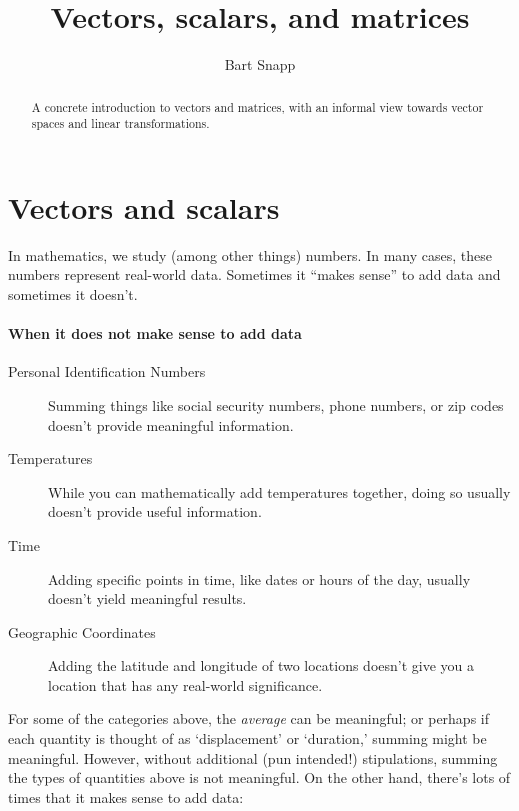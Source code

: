\documentclass{ximera}
\author{Bart Snapp}
\title{Vectors, scalars, and matrices}
\begin{document}
\begin{abstract}
  A concrete introduction to vectors and matrices, with an informal
  view towards vector spaces and linear transformations.
\end{abstract}
\maketitle


\section{Vectors and scalars}

In mathematics, we study (among other things) numbers. In many cases,
these numbers represent real-world data. Sometimes it ``makes sense''
to add data and sometimes it doesn't.
\paragraph{When it does not make sense to add data}
\begin{description}
\item[Personal Identification Numbers] Summing things like social
  security numbers, phone numbers, or zip codes doesn't provide
  meaningful information.
\item[Temperatures] While you can mathematically add temperatures
  together, doing so usually doesn't provide useful information.
\item[Time] Adding specific points in time, like dates or hours of the
  day, usually doesn't yield meaningful results. 
\item[Geographic Coordinates] Adding the latitude and longitude of two
  locations doesn't give you a location that has any real-world
  significance.
\end{description}
For some of the categories above, the \textit{average} can be
meaningful; or perhaps if each quantity is thought of as
`displacement' or `duration,' summing might be meaningful. However,
without additional (pun intended!) stipulations, summing the types of
quantities above is not meaningful. On the other hand, there's lots of
times that it makes sense to add data:
\end{document}
